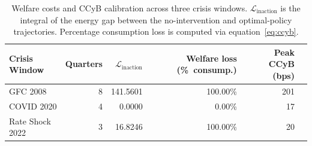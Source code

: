 \begin{table}[h]
\centering
\caption{Welfare costs and CCyB calibration across three crisis windows. $\mathcal{L}_{\mathrm{inaction}}$ is the integral of the energy gap between the no-intervention and optimal-policy trajectories. Percentage consumption loss is computed via equation~\eqref{eq:ccyb}.}
\label{tab:welfare}
\begin{tabular}{lrrrrr}
\toprule
Crisis Window & Quarters & $\mathcal{L}_{\mathrm{inaction}}$ & Welfare loss (\%~consump.) & Peak CCyB (bps) \\
\midrule
GFC 2008 & 8 & 141.5601 & 100.00\% & 201 \\
COVID 2020 & 4 & 0.0000 & 0.00\% & 17 \\
Rate Shock 2022 & 3 & 16.8246 & 100.00\% & 20 \\
\bottomrule
\end{tabular}
\end{table}
